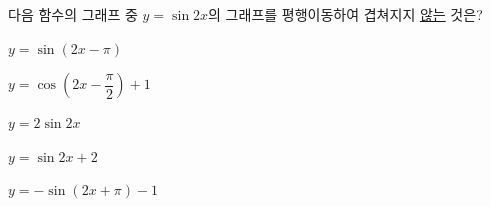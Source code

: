 다음 함수의 그래프 중 $y=\sin 2x$의 그래프를 평행이동하여 겹쳐지지 \underline{않는} 것은?
\begin{choicesii}{\rule[-3ex]{0pt}{8ex}$y=\sin(2x-\pi)$}{\rule[-3ex]{0pt}{8ex}$y=\cos\left(2x-\dfrac{\pi}{2}\right)+1$}{\rule[-3ex]{0pt}{8ex}$y=2\sin 2x$}{\rule[-3ex]{0pt}{8ex}$y=\sin 2x+2$}{\rule[-3ex]{0pt}{8ex}$y=-\sin(2x+\pi)-1$}\end{choicesii}
